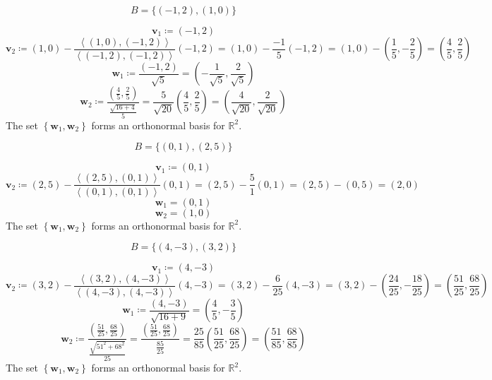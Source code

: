 \documentclass[12pt, letterpaper]{report}
\begin{document}
\begin{exercise}
    \[
        B=\{ (-1,2),(1,0) \}
    \]
\end{exercise}
\begin{solution}
    \[
        \mathbf{v}_1\coloneqq (-1,2)
    \]
    \[
        \mathbf{v} _2\coloneqq (1,0)-\frac{\left\langle (1,0),(-1,2) \right\rangle }{\left\langle (-1,2),(-1,2) \right\rangle }(-1,2)=(1,0)- \frac{-1}{5}(-1,2)=(1,0)- \left( \frac{1}{5},-\frac{2}{5} \right) = \left( \frac{4}{5},\frac{2}{5} \right)
    \]
    \[
        \mathbf{w}_1\coloneqq \frac{(-1,2)}{\sqrt{5} }= \left( -\frac{1}{\sqrt{5} },\frac{2}{\sqrt{5} } \right)
    \]
    \[
        \mathbf{w} _2\coloneqq \frac{\left( \frac{4}{5},\frac{2}{5} \right) }{\frac{\sqrt{16+4} }{5}}= \frac{5}{\sqrt{20} }\left(\frac{4}{5},\frac{2}{5}  \right) =\left( \frac{4}{\sqrt{20} },\frac{2}{\sqrt{20} }  \right)
    \]
    The set \(\left\{ \mathbf{w} _1,\mathbf{w} _2 \right\} \) forms an orthonormal basis for \(\mathbb{R} ^2\).
\end{solution}
\begin{exercise}
    \[
        B=\{ (0,1),(2,5) \} 
    \]
\end{exercise}	
\begin{solution}
    \[
        \mathbf{v} _1\coloneqq (0,1)
    \]
    \[
        \mathbf{v} _2\coloneqq (2,5)-\frac{\left\langle (2,5),(0,1) \right\rangle }{\left\langle (0,1),(0,1) \right\rangle }(0,1) = (2,5)-\frac{5}{1}(0,1)=(2,5)-(0,5)=(2,0)
    \]
    \[
        \mathbf{w}_1=(0,1)
    \]
    \[
        \mathbf{w}_2 = (1,0)
    \]
    The set \(\left\{ \mathbf{w} _1,\mathbf{w} _2 \right\} \) forms an orthonormal basis for \(\mathbb{R} ^2\).
\end{solution}
\begin{exercise}
    \[
        B=\{ (4,-3),(3,2) \} 
    \]
\end{exercise}
\begin{solution}
    \[
        \mathbf{v} _1\coloneqq (4,-3)
    \]
    \[
        \mathbf{v} _2\coloneqq (3,2)-\frac{\left\langle (3,2),(4,-3) \right\rangle }{\left\langle (4,-3),(4,-3) \right\rangle }(4,-3)=(3,2)-\frac{6}{25}(4,-3)=(3,2)- \left( \frac{24}{25},-\frac{18}{25} \right)=\left( \frac{51}{25},\frac{68}{25} \right)
    \]
    \[
        \mathbf{w} _1\coloneqq \frac{(4,-3)}{\sqrt{16+9} }=\left( \frac{4}{5},-\frac{3}{5} \right)
    \]
    \[
        \mathbf{w} _2\coloneqq \frac{\left( \frac{51}{25},\frac{68}{25} \right)}{\frac{\sqrt{51^2 + 68^2} }{25}}=\frac{\left( \frac{51}{25},\frac{68}{25} \right)}{\frac{85}{25}}=\frac{25}{85}\left( \frac{51}{25},\frac{68}{25} \right)=\left( \frac{51}{85},\frac{68}{85} \right) 
    \]
    The set \(\left\{ \mathbf{w} _1,\mathbf{w} _2 \right\} \) forms an orthonormal basis for \(\mathbb{R} ^2\).
\end{solution}
\end{document}
